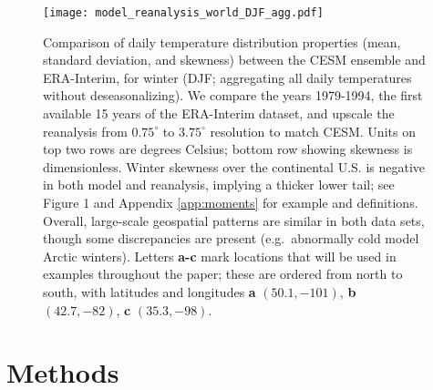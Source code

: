 \documentclass{ametsoc}
\newcommand\smallfigwidth{\columnwidth}
\begin{document}
\begin{figure}[t]       %
\centerline{\texttt{[image: model\_reanalysis\_world\_DJF\_agg.pdf]}}
\caption{\small{Comparison of daily temperature distribution properties (mean, standard deviation, and skewness) between the CESM ensemble and ERA-Interim, for winter (DJF; aggregating all daily temperatures without deseasonalizing).
 We compare the years 1979-1994, the first available 15 years of the ERA-Interim dataset, and upscale the reanalysis from $0.75^{\circ}$ to $3.75^{\circ}$ resolution to match CESM. Units on top two rows are degrees Celsius; bottom row showing skewness is dimensionless. Winter skewness over the continental U.S. is negative in both model and reanalysis, implying a thicker lower tail; see Figure 1 and Appendix \ref{app:moments} for example and definitions. Overall, large-scale geospatial patterns are similar in both data sets, though some discrepancies are present (e.g.\ abnormally cold model Arctic winters).  Letters \textbf{a-c} mark locations that will be used in examples throughout the paper; these are ordered from north to south, with latitudes and longitudes \textbf{a} $(50.1, -101)$, \textbf{b} $(42.7, -82)$, \textbf{c} $(35.3, -98)$.}}
\label{model_reanalysis_world}          %
\end{figure}

\section{Methods}
\label{sec:model}
\end{document}
